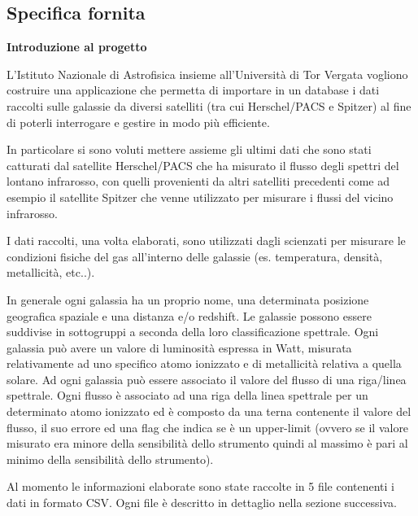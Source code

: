 \documentclass[12pt,a4paper,onecolumn]{article}
\begin{document}
	\subsection{Specifica fornita}
	\begin{flushleft}
		\textbf{Introduzione al progetto}\newline
		
		L’Istituto Nazionale di Astrofisica insieme all’Università di Tor Vergata vogliono costruire una applicazione che permetta di importare in un database i dati raccolti sulle galassie da diversi satelliti (tra cui Herschel/PACS e Spitzer) al fine di poterli interrogare e gestire in modo più efficiente.\newline
		
		In particolare si sono voluti mettere assieme gli ultimi dati che sono stati catturati dal satellite Herschel/PACS che ha misurato il flusso degli spettri del lontano infrarosso, con quelli provenienti da altri satelliti precedenti come ad esempio il satellite Spitzer che venne utilizzato per misurare i flussi del vicino infrarosso.\newline
		
		I dati raccolti, una volta elaborati, sono utilizzati dagli scienzati per misurare le condizioni fisiche del gas all’interno delle galassie (es. temperatura, densità, metallicità, etc..).\newline
		
		In generale ogni galassia ha un proprio nome, una  determinata posizione geografica spaziale e una distanza e/o redshift. Le galassie possono essere suddivise in sottogruppi a seconda della loro classificazione spettrale. Ogni galassia può avere un valore di luminosità espressa in Watt, misurata relativamente ad uno specifico atomo ionizzato e di metallicità relativa a quella solare. Ad ogni galassia può essere associato il valore del flusso di una riga/linea spettrale. Ogni flusso è associato ad una riga della linea spettrale per un determinato atomo ionizzato ed è composto da una terna contenente il valore del flusso, il suo errore ed una flag che indica se è un upper-limit (ovvero se il valore misurato era minore della sensibilità dello strumento quindi al massimo è pari al minimo della sensibilità dello strumento).\newline
		
		Al momento le informazioni elaborate sono state raccolte in 5 file contenenti i dati in formato CSV. Ogni file è descritto in dettaglio nella sezione successiva.\newline\newline
		

\end{flushleft}
\end{document}
